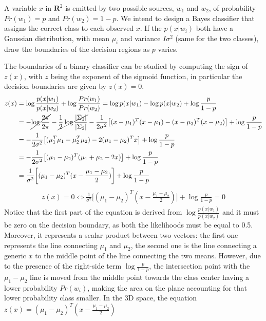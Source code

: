 \Exercise[number={2}]
A variable \(x\) in \(\mathbf{R}^2\) is emitted by two possible sources,
\(w_1\) and \(w_2\), of probability \(Pr(w_1)=p\) and \(Pr(w_2)=1-p\). 
We intend to design a Bayes classifier that assigns the correct class to each
observed \(x\). If the \(p(x|w_i)\) both have a Gaussian distribution, with
mean \(\mu_i\) and variance \(I\sigma^2\) (same for the two classes),
draw the boundaries of the decision regions as \(p\) varies.

\Answer[number={2}]
The boundaries of a binary classifier can be studied by computing the
sign of \(z(x)\), with \(z\) being the exponent of the sigmoid function, in
particular the decision boundaries are given by \(z(x)=0\).
\begin{align*}
    z(x)
    &=\log{\frac{p(x|w_1)}{p(x|w_2)}} + \log{\frac{Pr(w_1)}{Pr(w_2)}}
    =\log{p(x|w_1)}-\log{p(x|w_2)}+\log{\frac{p}{1-p}}\\
    &=-\cancel{\log{\frac{2\pi}{2\pi}}}-\cancel{\frac{1}{2}\log{\frac{|\Sigma_1|}{|\Sigma_2|}}}-\frac{1}{2\sigma^2}\bigl[(x-\mu_1)^T(x-\mu_1)-(x-\mu_2)^T(x-\mu_2)\bigr]+\log{\frac{p}{1-p}}\\
    &=-\frac{1}{2\sigma^2}\bigl[(\mu_1^T\mu_1-\mu_2^T\mu_2)-2(\mu_1-\mu_2)^Tx\bigr]+\log{\frac{p}{1-p}}\\
    &=-\frac{1}{2\sigma^2}\bigl[(\mu_1-\mu_2)^T(\mu_1+\mu_2-2x)\bigr]+\log{\frac{p}{1-p}}\\
    &=\frac{1}{\sigma^2}\biggl[(\mu_1-\mu_2)^T(x-\frac{\mu_1-\mu_2}{2})\biggr]+\log{\frac{p}{1-p}}
\end{align*}
\begin{align*}
    z(x)=0 \Longleftrightarrow \frac{1}{\sigma^2}\biggl[(\mu_1-\mu_2)^T(x-\frac{\mu_1-\mu_2}{2})\biggr]+\log{\frac{p}{1-p}}=0
\end{align*}
Notice that the first part of the equation is derived from
\(\log{\frac{p(x|w_1)}{p(x|w_2)}}\) and it must be zero on the decision
boundary, as both the likelihoods must be equal to 0.5. Moreover, it represents
a scalar product between two vectors: the first one represents the line
connecting \(\mu_1\) and \(\mu_2\), the second one is the line connecting
a generic \(x\) to the middle point of the line connecting the two means.
However, due to the presence of the right-side term \(\log{\frac{p}{1-p}}\),
the intersection point with the \(\mu_1-\mu_2\) line is moved from
the middle point towards the class center having a lower probability \(Pr(w_i)\),
making the area on the plane accounting for that lower probability class smaller.
In the 3D space, the equation \(z(x)=(\mu_1-\mu_2)^T(x-\frac{\mu_1-\mu_2}{2})\)
